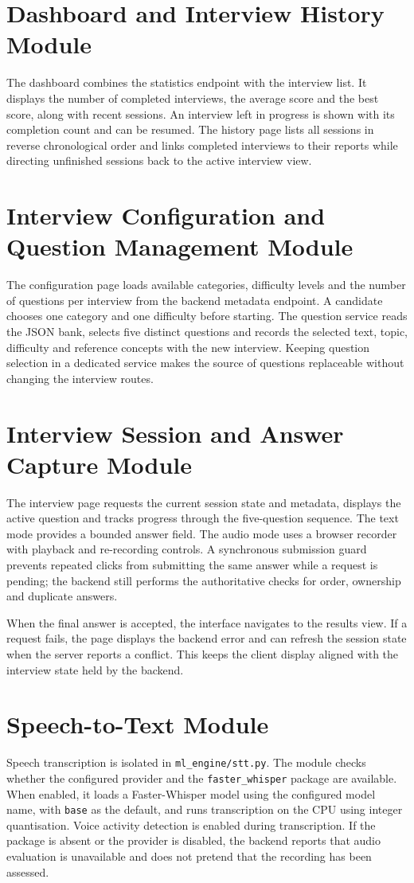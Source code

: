 \documentclass[12pt,a4paper,oneside]{report}
\begin{document}
\section{Dashboard and Interview History Module}
The dashboard combines the statistics endpoint with the interview list. It displays the number of completed interviews, the average score and the best score, along with recent sessions. An interview left in progress is shown with its completion count and can be resumed. The history page lists all sessions in reverse chronological order and links completed interviews to their reports while directing unfinished sessions back to the active interview view.

\section{Interview Configuration and Question Management Module}
The configuration page loads available categories, difficulty levels and the number of questions per interview from the backend metadata endpoint. A candidate chooses one category and one difficulty before starting. The question service reads the JSON bank, selects five distinct questions and records the selected text, topic, difficulty and reference concepts with the new interview. Keeping question selection in a dedicated service makes the source of questions replaceable without changing the interview routes.

\section{Interview Session and Answer Capture Module}
The interview page requests the current session state and metadata, displays the active question and tracks progress through the five-question sequence. The text mode provides a bounded answer field. The audio mode uses a browser recorder with playback and re-recording controls. A synchronous submission guard prevents repeated clicks from submitting the same answer while a request is pending; the backend still performs the authoritative checks for order, ownership and duplicate answers.

When the final answer is accepted, the interface navigates to the results view. If a request fails, the page displays the backend error and can refresh the session state when the server reports a conflict. This keeps the client display aligned with the interview state held by the backend.

\section{Speech-to-Text Module}
Speech transcription is isolated in \texttt{ml\_engine/stt.py}. The module checks whether the configured provider and the \texttt{faster\_whisper} package are available. When enabled, it loads a Faster-Whisper model using the configured model name, with \texttt{base} as the default, and runs transcription on the CPU using integer quantisation. Voice activity detection is enabled during transcription. If the package is absent or the provider is disabled, the backend reports that audio evaluation is unavailable and does not pretend that the recording has been assessed.
\end{document}
